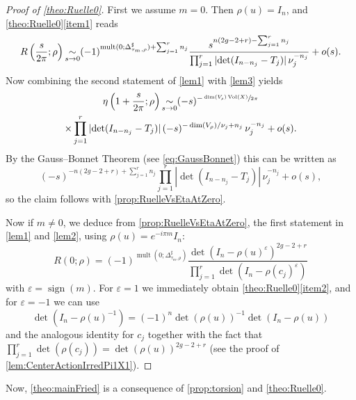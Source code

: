 \documentclass[JEP,XML,SOM,Unicode,NoFloatCountersInSection,published]{cedram}
\newcommand{\simm}{\mathop{\sim}\displaylimits}
\theoremstyle{plain}
\theoremstyle{definition}
\theoremstyle{remark}
\DeclareMathOperator{\Vol}{Vol}
\DeclareMathOperator{\sign}{sign}
\numberwithin{equation}{section}
\DeclareMathOperator{\mult}{mult}
\begin{document}
\begin{proof}[Proof of \cref{theo:Ruelle0}]
First we assume $m=0$. Then $\rho(u) = I_n$, and \cref{theo:Ruelle0}\eqref{item1} reads
\[
R\left(\frac s {2\pi}; \rho\right) \simm_{s\to 0} (-1)^{\mult(0;\Delta_{\tau_m,\rho}^\sharp)+\sum_{j=1}^r n_j}\frac{s^{n(2g-2+r) - \sum_{j=1}^r n_j}}{\prod_{j=1}^r|{\det} (I_{n-n_j} - T_j)|\,\nu_j^{-n_j}} + o(s).
\]
Now combining the second statement of \cref{lem1} with \cref{lem3} yields
\begin{multline*}
\eta\left(1+\frac s {2\pi};\rho\right) \simm_{s\to0} (-s)^{-\sfrac{\dim(V_\rho)\Vol(X)}{2\pi}}\\
\times\prod_{j=1}^r |{\det}(I_{n-n_j} -T_j)|\,(-s)^{-\dim(V_\rho)/\nu_j + n_j}\, \nu_j^{-n_j} + o(s).
\end{multline*}
By the Gauss--Bonnet Theorem (see \cref{eq:GaussBonnet}) this can be written as
\[
(-s)^{-n(2g-2+r)+\sum_{j=1}^rn_j}\prod_{j=1}^r |{\det}(I_{n-n_j} -T_j)|\, \nu_j^{-n_j} + o(s),
\]
so the claim follows with \cref{prop:RuelleVsEtaAtZero}.

Now if $m\neq 0$, we deduce from \cref{prop:RuelleVsEtaAtZero}, the first statement in \cref{lem1} and \cref{lem2}, using $\rho(u)= e^{-i\pi m} I_n$:
\[
R(0;\rho) = (-1)^{\mult(0;\Delta_{\tau_m,\rho}^\sharp)}\frac{\det(I_n-\rho(u)^\varepsilon)^{2g-2+r}}{\prod_{j=1}^r\det(I_n-\rho(c_j)^\varepsilon)}
\]
with $\varepsilon=\sign(m)$. For $\varepsilon=1$ we immediately obtain \cref{theo:Ruelle0}\eqref{item2}, and for $\varepsilon=-1$ we can use
\[
\det(I_n-\rho(u)^{-1})=(-1)^n\det(\rho(u))^{-1}\det(I_n-\rho(u))
\]
and the analogous identity for $c_j$ together with the fact that $\prod_{j=1}^r \det(\rho(c_j))=\det(\rho(u))^{2g-2+r}$ (see the proof of \cref{lem:CenterActionIrredPi1X1}).
\end{proof}

Now, \cref{theo:mainFried} is a consequence of \cref{prop:torsion} and \cref{theo:Ruelle0}.

\backmatter


\end{document}
